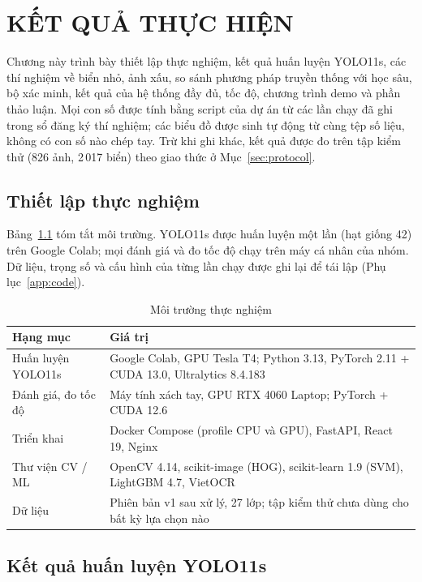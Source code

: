 \chapter{KẾT QUẢ THỰC HIỆN}
\label{chap:chuong3}

Chương này trình bày thiết lập thực nghiệm, kết quả huấn luyện YOLO11s, các thí nghiệm về biển nhỏ, ảnh xấu, so sánh phương pháp truyền thống với học sâu, bộ xác minh, kết quả của hệ thống đầy đủ, tốc độ, chương trình demo và phần thảo luận. Mọi con số được tính bằng script của dự án từ các lần chạy đã ghi trong sổ đăng ký thí nghiệm; các biểu đồ được sinh tự động từ cùng tệp số liệu, không có con số nào chép tay. Trừ khi ghi khác, kết quả được đo trên tập kiểm thử (826 ảnh, 2\,017 biển) theo giao thức ở Mục~\ref{sec:protocol}.

\section{Thiết lập thực nghiệm}
\label{sec:setup}

Bảng~\ref{tab:env} tóm tắt môi trường. YOLO11s được huấn luyện một lần (hạt giống 42) trên Google Colab; mọi đánh giá và đo tốc độ chạy trên máy cá nhân của nhóm. Dữ liệu, trọng số và cấu hình của từng lần chạy được ghi lại để tái lập (Phụ lục~\ref{app:code}).

\begin{table}[H]
\centering
\caption{Môi trường thực nghiệm}
\label{tab:env}
\small
\begin{tabularx}{\textwidth}{|>{\raggedright\arraybackslash}p{3.4cm}|>{\raggedright\arraybackslash}X|}
\toprule
\textbf{Hạng mục} & \textbf{Giá trị} \\
\midrule
Huấn luyện YOLO11s & Google Colab, GPU Tesla T4; Python 3.13, PyTorch 2.11 + CUDA 13.0, Ultralytics 8.4.183 \\ \hline
Đánh giá, đo tốc độ & Máy tính xách tay, GPU RTX 4060 Laptop; PyTorch + CUDA 12.6 \\ \hline
Triển khai & Docker Compose (profile CPU và GPU), FastAPI, React 19, Nginx \\ \hline
Thư viện CV / ML & OpenCV 4.14, scikit-image (HOG), scikit-learn 1.9 (SVM), LightGBM 4.7, VietOCR \\ \hline
Dữ liệu & Phiên bản v1 sau xử lý, 27 lớp; tập kiểm thử chưa dùng cho bất kỳ lựa chọn nào \\
\bottomrule
\end{tabularx}
\end{table}

\section{Kết quả huấn luyện YOLO11s}
\label{sec:baseline}

